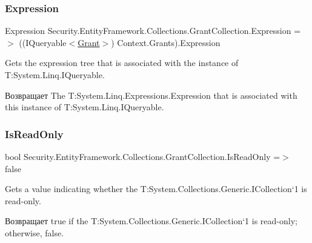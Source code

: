 \subsubsection{\texorpdfstring{Expression}{Expression}}
{\footnotesize\ttfamily Expression Security.\+Entity\+Framework.\+Collections.\+Grant\+Collection.\+Expression =$>$ ((I\+Queryable$<$\hyperlink{class_security_1_1_model_1_1_grant}{Grant}$>$) Context.\+Grants).Expression}



Gets the expression tree that is associated with the instance of T\+:\+System.\+Linq.\+I\+Queryable. 

\begin{DoxyReturn}{Возвращает}
The T\+:\+System.\+Linq.\+Expressions.\+Expression that is associated with this instance of T\+:\+System.\+Linq.\+I\+Queryable. 
\end{DoxyReturn}
\mbox{\label{class_security_1_1_entity_framework_1_1_collections_1_1_grant_collection_af456c4626259b99e823d1ec4c17359a5}} 
\subsubsection{\texorpdfstring{Is\+Read\+Only}{IsReadOnly}}
{\footnotesize\ttfamily bool Security.\+Entity\+Framework.\+Collections.\+Grant\+Collection.\+Is\+Read\+Only =$>$ false}



Gets a value indicating whether the T\+:\+System.\+Collections.\+Generic.\+I\+Collection`1 is read-\/only. 

\begin{DoxyReturn}{Возвращает}
true if the T\+:\+System.\+Collections.\+Generic.\+I\+Collection`1 is read-\/only; otherwise, false. 
\end{DoxyReturn}
\mbox{\label{class_security_1_1_entity_framework_1_1_collections_1_1_grant_collection_a65cbd1cfdc8df59f288fec61a9637942}} 
